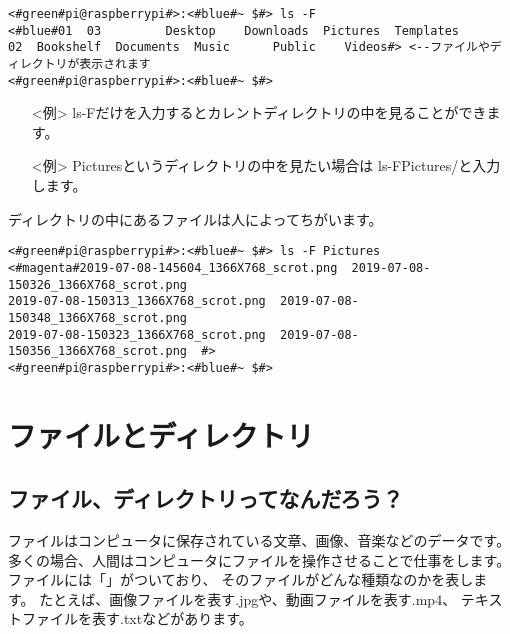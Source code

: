\begin{lstlisting}[caption=ls -F コマンドの例,label=lsFtest]
<#green#pi@raspberrypi#>:<#blue#~ $#> ls -F
<#blue#01  03         Desktop    Downloads  Pictures  Templates
02  Bookshelf  Documents  Music      Public    Videos#> <--ファイルやディレクトリが表示されます
<#green#pi@raspberrypi#>:<#blue#~ $#>
\end{lstlisting}

\begin{itemize}
\item[<例>] ls\textvisiblespace -Fだけを入力するとカレントディレクトリの中を見ることができます。 
\item[<例>] Picturesというディレクトリの中を見たい場合は ls\textvisiblespace -F\textvisiblespace Pictures/と入力します。 
\end{itemize}

ディレクトリの中にあるファイルは人によってちがいます。
\begin{lstlisting}[caption=ls -F Pictures/コマンドの例,label=lsFPicttest]
<#green#pi@raspberrypi#>:<#blue#~ $#> ls -F Pictures
<#magenta#2019-07-08-145604_1366X768_scrot.png  2019-07-08-150326_1366X768_scrot.png  
2019-07-08-150313_1366X768_scrot.png  2019-07-08-150348_1366X768_scrot.png  
2019-07-08-150323_1366X768_scrot.png  2019-07-08-150356_1366X768_scrot.png  #>
<#green#pi@raspberrypi#>:<#blue#~ $#> 
\end{lstlisting}

\begin{tcolorbox}[title=\useOmetoi]
\begin{enumerate}
\end{enumerate}
\end{tcolorbox}

\section{ファイルとディレクトリ}
\subsection{ファイル、ディレクトリってなんだろう？}
ファイルはコンピュータに保存されている文章、画像、音楽などのデータです。
多くの場合、人間はコンピュータにファイルを操作させることで仕事をします。
ファイルには「」がついており、
そのファイルがどんな種類なのかを表します。
たとえば、画像ファイルを表す.jpgや、動画ファイルを表す.mp4、
テキストファイルを表す.txtなどがあります。

